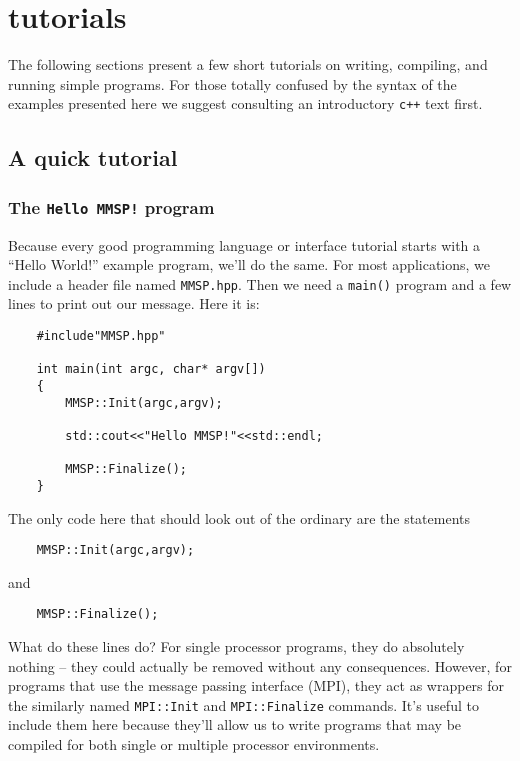 
\chapter{\MMSP tutorials}
The following sections present a few short tutorials on writing, compiling, and running simple \MMSP programs.  For those totally confused by the syntax of the examples presented here we suggest consulting an introductory {\tt c++} text first.

\section{A quick tutorial}
\subsection{The {\tt Hello MMSP!} program}
Because every good programming language or interface tutorial starts with a ``Hello World!'' example program, we'll do the same.  For most \MMSP applications, we include a header file named {\tt MMSP.hpp}.  Then we need a {\tt main()} program and a few lines to print out our message.  Here it is:
\begin{shadebox}
\begin{verbatim}
    #include"MMSP.hpp"

    int main(int argc, char* argv[])
    {
        MMSP::Init(argc,argv);

        std::cout<<"Hello MMSP!"<<std::endl;

        MMSP::Finalize();
    }
\end{verbatim}
\end{shadebox}
The only code here that should look out of the ordinary are the statements
\begin{shadebox}
\begin{verbatim}
    MMSP::Init(argc,argv);
\end{verbatim}
\end{shadebox}
and
\begin{shadebox}
\begin{verbatim}
    MMSP::Finalize();
\end{verbatim}
\end{shadebox}
What do these lines do?  For single processor programs, they do absolutely nothing -- they could actually be removed without any consequences.  However, for programs that use the message passing interface (MPI), they act as wrappers for the similarly named {\tt MPI::Init} and {\tt MPI::Finalize} commands.  It's useful to include them here because they'll allow us to write programs that may be compiled for both single or multiple processor environments.

